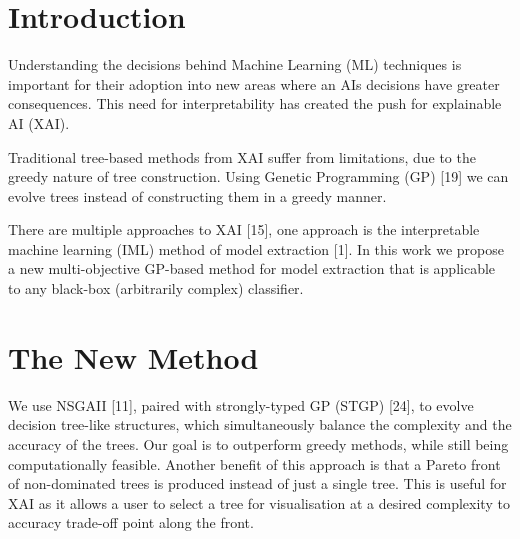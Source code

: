 \section{Introduction} 
Understanding the decisions behind Machine Learning (ML) techniques is important for their adoption into new areas where an AI\textquotesingle s decisions have greater consequences. This need for interpretability has created the push for explainable AI (XAI).


Traditional tree-based methods from XAI suffer from limitations, due to the greedy nature of tree construction. Using Genetic Programming (GP) [19] we can evolve trees instead of constructing them in a greedy manner.

There are multiple approaches to XAI [15], one approach is the interpretable machine learning (IML) method of model extraction [1]. In this work we propose a new multi-objective GP-based method for model extraction that is applicable to any black-box (arbitrarily complex) classifier.

\section{The New Method}
We use NSGAII [11], paired with strongly-typed GP (STGP) [24], to evolve decision tree-like structures, which simultaneously balance the complexity and the accuracy of the trees. Our goal is to outperform greedy methods, while still being computationally feasible. Another benefit of this approach is that a Pareto front of non-dominated trees is produced instead of just a single tree. This is useful for XAI as it allows a user to select a tree for visualisation at a desired complexity to accuracy trade-off point along the front.
